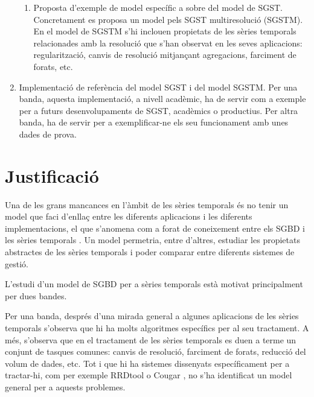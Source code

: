 \begin{enumerate}
\begin{enumerate}
  \item Proposta d'exemple de model específic a sobre del model de
    SGST. Concretament es proposa un model pels SGST multiresolució
    (SGSTM).  En el model de SGSTM s'hi inclouen propietats de les
    sèries temporals relacionades amb la resolució que s'han observat
    en les seves aplicacions: regularització, canvis de resolució
    mitjançant agregacions, farciment de forats, etc.  
  \end{enumerate}

\item Implementació de referència del model SGST i del model
  SGSTM. Per una banda, aquesta implementació, a nivell acadèmic, ha
  de servir com a exemple per a futurs desenvolupaments de SGST,
  acadèmics o productius. Per altra banda, ha de servir per a
  exemplificar-ne els seu funcionament amb unes dades de prova.



\end{enumerate}






\section{Justificació}

Una de les grans mancances en l'àmbit de les sèries temporals és no
tenir un model que faci d'enllaç entre les diferents aplicacions i les
diferents implementacions, el que s'anomena com a forat de coneixement
entre els SGBD i les sèries
temporals \parencite{zhang11,stonebraker09:scidb}. Un model permetria,
entre d'altres, estudiar les propietats abstractes de les sèries
temporals i poder comparar entre diferents sistemes de gestió.



L'estudi d'un model de SGBD per a sèries temporals està motivat
principalment per dues bandes.


Per una banda, després d'una mirada general a algunes aplicacions de
les sèries temporals s'observa que hi ha molts algoritmes específics
per al seu tractament. A més, s'observa que en el tractament de les
sèries temporals es duen a terme un conjunt de tasques comunes: canvis
de resolució, farciment de forats, reducció del volum de dades, etc.
Tot i que hi ha sistemes dissenyats específicament per a tractar-hi,
com per exemple RRDtool \parencite{rrdtool} o
Cougar \parencite{fung02}, no s'ha identificat un model general per a
aquests problemes.

